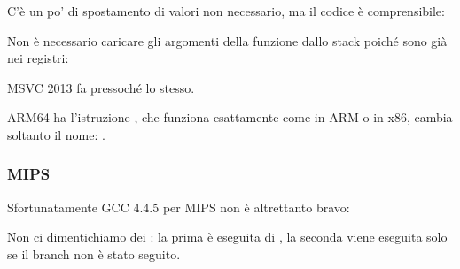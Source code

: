 

C'è un po' di spostamento di valori non necessario, ma il codice è comprensibile:




Non è necessario caricare gli argomenti della funzione dallo stack poiché sono già nei registri:



MSVC 2013 fa pressoché lo stesso.


ARM64 ha l'istruzione , che funziona esattamente come  in ARM o  in x86, cambia soltanto il nome:
.



\subsubsection{MIPS}

Sfortunatamente GCC 4.4.5 per MIPS non è altrettanto bravo:



Non ci dimentichiamo dei : la prima  è eseguita  di , 
la seconda  viene eseguita solo se il branch non è stato seguito.

